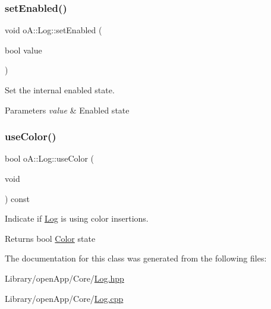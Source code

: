 \mbox{\label{classo_a_1_1_log_a7c4699ea7ad0c8b910b4a3fc57ba5afe}} 
\subsubsection{\texorpdfstring{set\+Enabled()}{setEnabled()}}
{\footnotesize\ttfamily void o\+A\+::\+Log\+::set\+Enabled (\begin{DoxyParamCaption}\item[{bool}]{value }\end{DoxyParamCaption})\hspace{0.3cm}{\ttfamily [noexcept]}}



Set the internal enabled state. 


\begin{DoxyParams}{Parameters}
{\em value} & Enabled state \\
\hline
\end{DoxyParams}
\mbox{\label{classo_a_1_1_log_a212bf1558c244679cf0e361fc1cf1e9a}} 
\subsubsection{\texorpdfstring{use\+Color()}{useColor()}}
{\footnotesize\ttfamily bool o\+A\+::\+Log\+::use\+Color (\begin{DoxyParamCaption}\item[{void}]{ }\end{DoxyParamCaption}) const\hspace{0.3cm}{\ttfamily [noexcept]}}



Indicate if \mbox{\hyperlink{classo_a_1_1_log}{Log}} is using color insertions. 

\begin{DoxyReturn}{Returns}
bool \mbox{\hyperlink{classo_a_1_1_color}{Color}} state 
\end{DoxyReturn}


The documentation for this class was generated from the following files\+:\begin{DoxyCompactItemize}
\item 
Library/open\+App/\+Core/\mbox{\hyperlink{_log_8hpp}{Log.\+hpp}}\item 
Library/open\+App/\+Core/\mbox{\hyperlink{_log_8cpp}{Log.\+cpp}}\end{DoxyCompactItemize}
